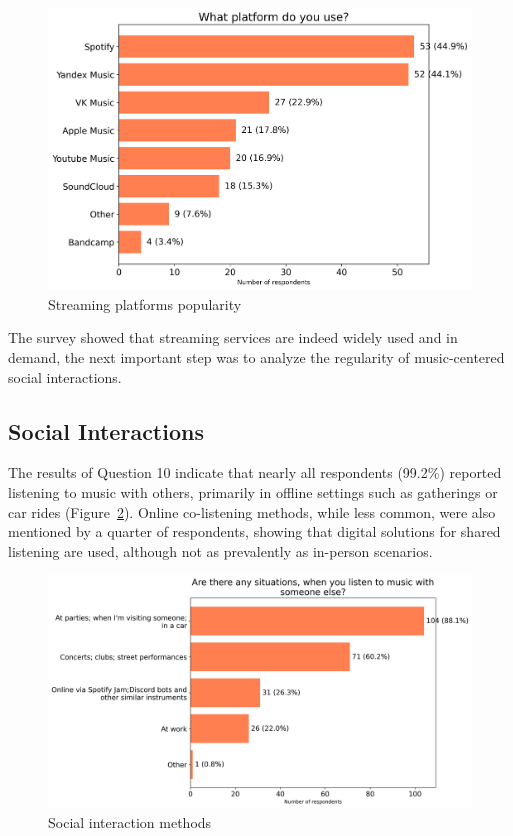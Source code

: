 \begin{figure}[htbp]
    \centering
    \includegraphics[height=0.4\textheight]{charts/streaming platform.png}
    \caption{Streaming platforms popularity}
    \label{fig:platform_popularity}
\end{figure}

The survey showed that streaming services are indeed widely used and in demand, the next important step was
to analyze the regularity of music-centered social interactions.

\subsection{Social Interactions}
The results of Question 10 indicate that nearly all respondents (99.2\%) reported listening to music with
others, primarily in offline settings such as gatherings or car rides (Figure~\ref{fig:listentogethermeth}).
Online co-listening methods, while less common, were also mentioned by a quarter of respondents,
showing that digital solutions for shared listening are used, although not as prevalently as in-person scenarios.

\begin{figure}[htbp]
    \centering
    \includegraphics[height=0.4\textheight]{charts/listen together method.png}
    \caption{Social interaction methods}
    \label{fig:listentogethermeth}
\end{figure}

